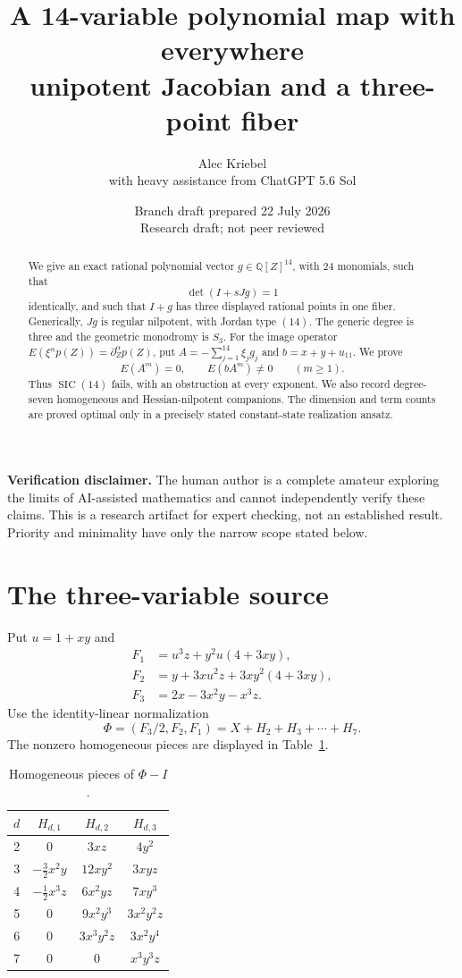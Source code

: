 \documentclass[11pt]{article}
\title{A 14-variable polynomial map with everywhere\\
unipotent Jacobian and a three-point fiber}
\author{Alec Kriebel\\[2pt]\large with heavy assistance from ChatGPT 5.6 Sol}
\date{Branch draft prepared 22 July 2026\\Research draft; not peer reviewed}
\newcommand{\Q}{\mathbb Q}
\newcommand{\SIC}{\operatorname{SIC}}
\begin{document}
\maketitle

\begin{abstract}
We give an exact rational polynomial vector $g\in\Q[Z]^{14}$, with
24 monomials, such that
\[
 \det(I+sJg)=1
\]
identically, and such that $I+g$ has three displayed rational points in one
fiber.  Generically, $Jg$ is regular nilpotent, with Jordan type $(14)$.
The generic degree is three and the geometric monodromy is $S_3$.
For the image operator
$E(\xi^\alpha p(Z))=\partial_Z^\alpha p(Z)$, put
$A=-\sum_{j=1}^{14}\xi_jg_j$ and $b=x+y+u_{11}$.  We prove
\[
 E(A^m)=0,\qquad E(bA^m)\ne0\qquad(m\geq1).
\]
Thus $\SIC(14)$ fails, with an obstruction at every exponent.  We also
record degree-seven homogeneous and Hessian-nilpotent companions.  The
dimension and term counts are proved optimal only in a precisely stated
constant-state realization ansatz.
\end{abstract}

\noindent\textbf{Verification disclaimer.}
The human author is a complete amateur exploring the limits of AI-assisted
mathematics and cannot independently verify these claims.  This is a research
artifact for expert checking, not an established result.  Priority and
minimality have only the narrow scope stated below.

\section{The three-variable source}

Put $u=1+xy$ and
\[
\begin{aligned}
F_1&=u^3z+y^2u(4+3xy),\\
F_2&=y+3xu^2z+3xy^2(4+3xy),\\
F_3&=2x-3x^2y-x^3z.
\end{aligned}
\]
Use the identity-linear normalization
\begin{equation}
 \Phi=(F_3/2,F_2,F_1)=X+H_2+H_3+\cdots+H_7. \label{eq:Phi}
\end{equation}
The nonzero homogeneous pieces are displayed in Table~\ref{tab:pieces}.
\begin{table}[ht]
\centering
\begin{tabular}{c|ccc}
\toprule
$d$&$H_{d,1}$&$H_{d,2}$&$H_{d,3}$\\
\midrule
2&0&$3xz$&$4y^2$\\
3&$-\tfrac32x^2y$&$12xy^2$&$3xyz$\\
4&$-\tfrac12x^3z$&$6x^2yz$&$7xy^3$\\
5&0&$9x^2y^3$&$3x^2y^2z$\\
6&0&$3x^3y^2z$&$3x^2y^4$\\
7&0&0&$x^3y^3z$\\
\bottomrule
\end{tabular}
\caption{Homogeneous pieces of $\Phi-I$.}
\label{tab:pieces}
\end{table}
\end{document}
